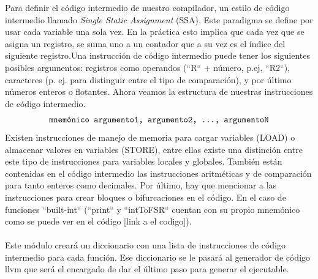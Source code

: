 Para definir el código intermedio de nuestro compilador, un estilo de código intermedio llamado \textit{Single Static Assignment} (SSA). Este paradigma se define por usar cada variable una sola vez. En la práctica esto implica que cada vez que se asigna un registro, se suma uno a un contador que a su vez es el índice del siguiente registro.Una instrucción de código intermedio puede tener los siguientes posibles argumentos: registros como operandos (``R`` + número, p.ej, ``R2``), caracteres (p. ej. para distinguir entre el tipo de comparación), y por último números enteros o flotantes. Ahora veamos la estructura de nuestras instrucciones de código intermedio.
\[ 
\texttt{ mnemónico argumento1, argumento2, \dots, argumentoN } 
\]
Existen instrucciones de manejo de memoria para cargar variables (LOAD) o almacenar valores en variables (\textsc{STORE}), entre ellas existe una distinción entre este tipo de instrucciones para variables locales y globales. También están contenidas en el código intermedio las instrucciones aritméticas y de comparación para tanto enteros como decimales. Por último, hay que mencionar a las instrucciones para crear bloques o bifurcaciones en el código. En el caso de funciones ``built-int`` (``print`` y ``intToFSR`` cuentan con su propio mnemónico como se puede ver en el código [link a el codigo]).\\\\
Este módulo creará un diccionario con una lista de instrucciones de código intermedio para cada función. Ese diccionario se le pasará al generador de código llvm que será el encargado de dar el último paso para generar el ejecutable. 
